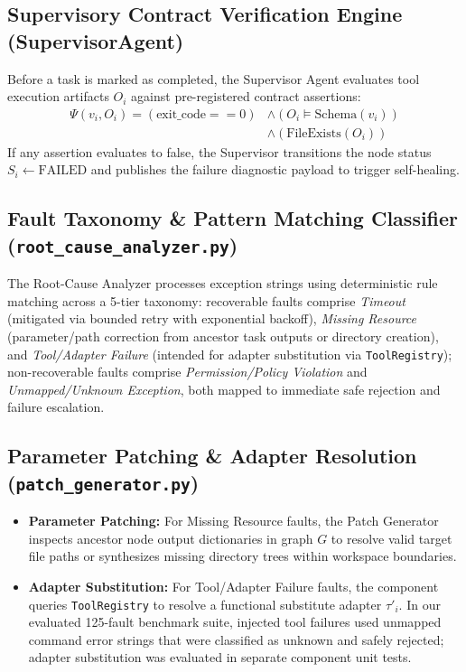 \documentclass[conference]{IEEEtran}
\newcommand{\chg}[1]{{\color{blue}#1}}
\begin{document}
\subsection{Supervisory Contract Verification Engine (SupervisorAgent)}
Before a task is marked as completed, the Supervisor Agent evaluates tool execution artifacts $O_i$ against pre-registered contract assertions:
\begin{align}
\Psi(v_i, O_i) = (\text{exit\_code} == 0) &\land (O_i \models \text{Schema}(v_i)) \nonumber \\
&\land (\text{FileExists}(O_i))
\end{align}
If any assertion evaluates to false, the Supervisor transitions the node status $S_i \leftarrow \text{FAILED}$ and publishes the failure diagnostic payload to trigger self-healing.

\subsection{Fault Taxonomy \& Pattern Matching Classifier (\texttt{root\_cause\_analyzer.py})}
\chg{The Root-Cause Analyzer processes exception strings using deterministic rule matching across a 5-tier taxonomy: recoverable faults comprise \textit{Timeout} (mitigated via bounded retry with exponential backoff), \textit{Missing Resource} (parameter/path correction from ancestor task outputs or directory creation), and \textit{Tool/Adapter Failure} (intended for adapter substitution via \texttt{ToolRegistry}); non-recoverable faults comprise \textit{Permission/Policy Violation} and \textit{Unmapped/Unknown Exception}, both mapped to immediate safe rejection and failure escalation.}

\subsection{\chg{Parameter Patching \& Adapter Resolution (\texttt{patch\_generator.py})}}
\begin{itemize}
    \item \textbf{Parameter Patching:} For Missing Resource faults, the Patch Generator inspects ancestor node output dictionaries in graph $G$ to resolve valid target file paths \chg{or synthesizes missing directory trees within workspace boundaries.}
    \item \textbf{Adapter Substitution:} For Tool/Adapter Failure faults, the component queries \texttt{ToolRegistry} to resolve a functional substitute adapter $\tau'_i$. \chg{In our evaluated 125-fault benchmark suite, injected tool failures used unmapped command error strings that were classified as unknown and safely rejected; adapter substitution was evaluated in separate component unit tests.}
\end{itemize}
\end{document}
